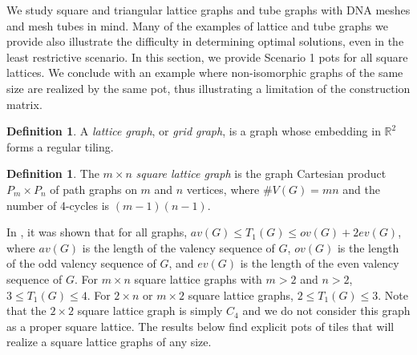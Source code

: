 \documentclass{elsarticle}
\theoremstyle{definition}
\newtheorem{definition}[theorem]{Definition}
\theoremstyle{remark}
\theoremstyle{plain}
\theoremstyle{plain}
\begin{document}
We study square and triangular lattice graphs and tube graphs with DNA meshes and mesh tubes in mind. Many of the examples of lattice and tube graphs we provide also illustrate the difficulty in determining optimal solutions, even in the least restrictive scenario. In this section, we provide Scenario 1 pots for all square lattices. We conclude with an example where non-isomorphic graphs of the same size are realized by the same pot, thus illustrating a limitation of the construction matrix. 

\begin{definition} A \textit{lattice graph}, or \textit{grid graph}, is a graph whose embedding in $\mathbb{R}^2$ forms a regular tiling. \end{definition}

\begin{definition} The $m \times n$ \emph{square lattice graph} is the graph Cartesian product $P_m \times P_n$ of path graphs on $m$ and $n$ vertices, where $\# V(G) = mn$ and the number of 4-cycles is  $(m-1)(n-1)$. \end{definition} 


In \cite{ellis2014minimal}, it was shown that for all graphs, $av(G) \leq T_1(G) \leq ov(G) + 2ev(G)$, where $av(G)$ is the length of the valency sequence of $G$, $ov(G)$ is the length of the odd valency sequence of $G$, and $ev(G)$ is the length of the even valency sequence of $G$. For $m \times n$ square lattice graphs with $m>2$ and $n>2$, $3 \leq T_1(G) \leq 4$. For $2 \times n$ or $m \times 2$ square lattice graphs, $2 \leq T_1(G) \leq 3$. Note that the $2 \times 2$ square lattice graph is simply $C_4$ and we do not consider this graph as a proper square lattice. The results below find explicit pots of tiles that will realize a square lattice graphs of any size.
\end{document}
